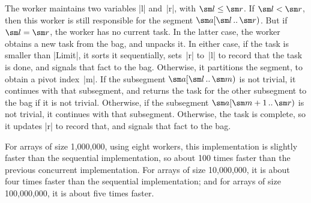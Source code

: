 
The worker maintains two variables |l| and~|r|, with $\sm l \le \sm r$.  If
$\sm l < \sm r$, then this worker is still responsible for the segment $\sm
a\interval{\sm l}{\sm r}$.  But if $\sm l = \sm r$, the worker has no current
task.  In the latter case, the worker obtains a new task from the bag, and
unpacks it.  In either case, if the task is smaller than |Limit|, it sorts it
sequentially, sets~|r| to~|l| to record that the task is done, and signals
that fact to the bag.  Otherwise, it partitions the segment, to obtain a pivot
index~|m|.  If the subsegment $\sm a\interval{\sm l}{\sm m}$ is not trivial,
it continues with that subsegment, and returns the task for the other
subsegment to the bag if it is not trivial.  Otherwise, if the subsegment $\sm
a\interval{\sm m+1}{\sm r}$ is not trivial, it continues with that subsegment.
Otherwise, the task is complete, so it updates |r| to record that, and signals
that fact to the bag.

For arrays of size 1,000,000, using eight workers, this implementation is
slightly faster than the sequential implementation, so about 100 times
faster than the previous concurrent implementation.  For arrays of size
10,000,000, it is about four times faster than the sequential
implementation; and for arrays of size 100,000,000, it is about five times
faster.
